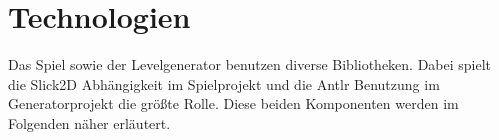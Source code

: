 \section{Technologien}

Das Spiel sowie der Levelgenerator benutzen diverse Bibliotheken. Dabei spielt die Slick2D Abhängigkeit im Spielprojekt und die Antlr Benutzung im Generatorprojekt die größte Rolle. Diese beiden Komponenten werden im Folgenden näher erläutert.


